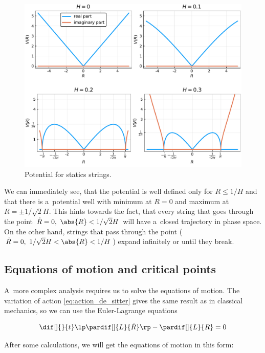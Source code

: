 \begin{figure}[ht]
    \centering
    \includegraphics[width = 1.0\linewidth]{Pictures/potential.pdf}
    \caption{Potential for statics strings.}
    \label{fig:potential_de_sitter}
\end{figure}

We can immediately see, that the potential is well defined only for $R \leq 1/H$ and that there is a~potential well with minimum at $R = 0$ and maximum at $R = \pm 1/\sqrt{2} H$. This hints towards the fact, that every string that goes through the point $\dot{R} = 0, ~\abs{R} < 1/\sqrt{2} H$ will have a~closed trajectory in phase space. On the other hand, strings that pass through the point ($\dot{R} = 0, ~1/\sqrt{2} H < \abs{R} < 1/H $) expand infinitely or until they break.

\subsection{Equations of motion and critical points}
\label{sec:EOM_critpoints}

A~more complex analysis requires us to solve the equations of motion. The variation of action \eqref{eq:action_de_sitter} gives the same result as in classical mechanics, so we can use the Euler-Lagrange equations

\begin{equation}
    \dif[] {} {t} \lp \pardif[] {L} {\dot{R}} \rp - \pardif[] {L} {R} = 0
\end{equation}

\noindent
After some calculations, we will get the equations of motion in this form:


